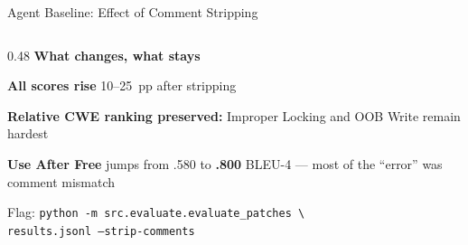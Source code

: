 \documentclass[aspectratio=169,10pt]{beamer}
\begin{document}
\begin{frame}{Agent Baseline: Effect of Comment Stripping}
\begin{columns}[T]
\begin{column}{0.48\textwidth}
  \vspace{0.6em}
  \textbf{What changes, what stays}

  \vspace{0.4em}
  \begin{itemize}\setlength{\itemsep}{3pt}
    {\scriptsize
    \item \textbf{All scores rise} 10--25~pp after stripping
    \item \textbf{Relative CWE ranking preserved:} Improper Locking
          and OOB Write remain hardest
    \item \textbf{Use After Free} jumps from .580 to \textbf{.800} BLEU-4 ---
          most of the ``error'' was comment mismatch}
  \end{itemize}

  \vspace{0.4em}
  {\scriptsize\color{black!55}
  Flag: \texttt{python -m src.evaluate.evaluate\_patches \textbackslash\\
  \quad results.jsonl --strip-comments}}

\end{column}
\end{columns}
\end{frame}
\end{document}
